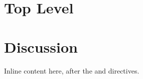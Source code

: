 \documentclass{article}
\begin{document}
\section{Top Level}




\section{Discussion}
Inline content here, after the  and  directives.
\end{document}
